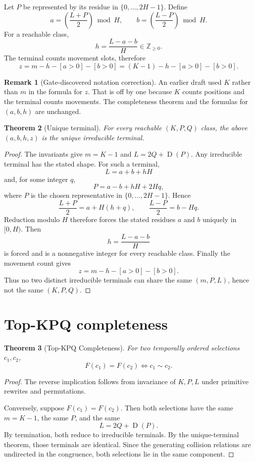 \documentclass[11pt]{article}
\newtheorem{theorem}{Theorem}
\theoremstyle{definition}
\newtheorem{remark}[theorem]{Remark}
\newcommand{\Z}{\mathbb{Z}}
\newcommand{\D}{\operatorname{D}}
\newcommand{\1}{\mathbf{1}}
\begin{document}
Let $P$ be represented by its residue in $\{0,\ldots,2H-1\}$. Define
\[
a=\left(\frac{L+P}{2}\right)\bmod H,\qquad
b=\left(\frac{L-P}{2}\right)\bmod H.
\]
For a reachable class,
\[
h=\frac{L-a-b}{H}\in\Z_{\ge0}.
\]
The terminal counts movement slots, therefore
\[
\boxed{
z=m-h-[a>0]-[b>0]
=(K-1)-h-[a>0]-[b>0].
}
\]

\begin{remark}[Gate-discovered notation correction]
An earlier draft used $K$ rather than $m$ in the formula for $z$. That is off by one because $K$ counts positions and the terminal counts movements. The completeness theorem and the formulas for $(a,b,h)$ are unchanged.
\end{remark}

\begin{theorem}[Unique terminal]
For every reachable $(K,P,Q)$ class, the above $(a,b,h,z)$ is the unique irreducible terminal.
\end{theorem}

\begin{proof}
The invariants give $m=K-1$ and $L=2Q+\D(P)$. Any irreducible terminal has the stated shape. For such a terminal,
\[
L=a+b+hH
\]
and, for some integer $q$,
\[
P=a-b+hH+2Hq,
\]
where $P$ is the chosen representative in $\{0,\ldots,2H-1\}$. Hence
\[
\frac{L+P}{2}=a+H(h+q),\qquad
\frac{L-P}{2}=b-Hq.
\]
Reduction modulo $H$ therefore forces the stated residues $a$ and $b$ uniquely in $[0,H)$. Then
\[
h=\frac{L-a-b}{H}
\]
is forced and is a nonnegative integer for every reachable class. Finally the movement count gives
\[
z=m-h-[a>0]-[b>0].
\]
Thus no two distinct irreducible terminals can share the same $(m,P,L)$, hence not the same $(K,P,Q)$.
\end{proof}

\section{Top-KPQ completeness}
\begin{theorem}[Top-KPQ Completeness]\label{thm:complete}
For two temporally ordered selections $c_1,c_2$,
\[
\boxed{
F(c_1)=F(c_2)\iff c_1\sim c_2.
}
\]
\end{theorem}

\begin{proof}
The reverse implication follows from invariance of $K,P,L$ under primitive rewrites and permutations.

Conversely, suppose $F(c_1)=F(c_2)$. Then both selections have the same $m=K-1$, the same $P$, and the same
\[
L=2Q+\D(P).
\]
By termination, both reduce to irreducible terminals. By the unique-terminal theorem, those terminals are identical. Since the generating collision relations are undirected in the congruence, both selections lie in the same component.
\end{proof}
\end{document}
